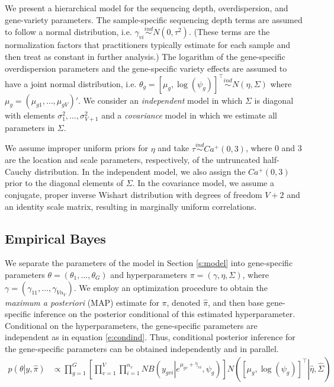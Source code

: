 \documentclass[useAMS,usenatbib,referee]{biom}
\begin{document}
We present a hierarchical model for the sequencing depth, overdispersion, and gene-variety parameters. The sample-specific sequencing depth terms are assumed to follow a normal distribution, i.e. $\gamma_{vi} \stackrel{ind}{\sim} N(0,\tau^2)$. (These terms are the normalization factors that practitioners typically estimate for each sample and then treat as constant in further analysis.) The logarithm of the gene-specific overdispersion parameters and the gene-specific variety effects are assumed to have a joint normal distribution, i.e. 
$\theta_g = [\mu_g, \log(\psi_g)]^\top \stackrel{ind}{\sim} N\left(\eta, \Sigma\right)$
where $\mu_g = (\mu_{g1},\ldots,\mu_{gV})'$. We consider an \emph{independent} model in which $\Sigma$ is diagonal with elements $\sigma_1^2,\ldots,\sigma_{V+1}^2$ and a \emph{covariance} model in which we estimate all parameters in $\Sigma$.

We assume improper uniform priors for $\eta$ and take 
$\tau\stackrel{ind}{\sim} Ca^+(0,3)$, where 0 and 3 are the location and scale parameters, respectively, of the untruncated half-Cauchy distribution. In the independent model, we also assign the $Ca^+(0,3)$ prior to the
diagonal elements
of $\Sigma$. In the covariance model, we assume a conjugate, proper inverse Wishart distribution with degrees of freedom $V+2$ and an identity scale matrix, resulting in marginally uniform correlations. 

\subsection{Empirical Bayes}
\label{s:ebayes}

We separate the parameters of the model in Section \ref{s:model} into gene-specific parameters $\theta = (\theta_1,\ldots,\theta_G)$ and hyperparameters $\pi = (\gamma,\eta, \Sigma)$, where $\gamma = (\gamma_{11},\ldots,\gamma_{Vn_V})$. We employ an optimization procedure to obtain the \emph{maximum a posteriori} (MAP) estimate for $\pi$, denoted $\hat{\pi}$, and then base gene-specific inference on the posterior conditional of this estimated hyperparameter. Conditional on the hyperparameters, the gene-specific parameters are independent as in equation \eqref{e:condind}. Thus, conditional posterior inference for the gene-specific parameters can be obtained independently and in parallel.
\begin{align}
p\left(\theta\left|y,\hat{\pi}\right.\right) 
&\propto \prod_{g=1}^G \left[ \prod_{v=1}^V \prod_{i=1}^{n_v} NB\left(y_{gvi}\left|e^{\mu_{gv}+\hat{\gamma}_{vi}},\psi_g\right.\right) \right] N\left(\left.\left[\mu_g, \log(\psi_g) \right]^\top\right|\hat{\eta}, \hat{\Sigma} \right) 
\label{e:condind}
\end{align}
\end{document}
